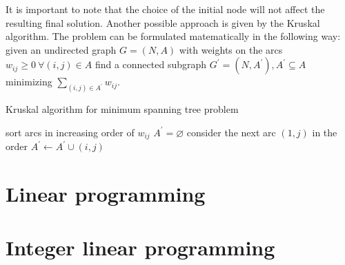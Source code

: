 \documentclass[12pt, a4paper]{report}
\theoremstyle{remark}
\begin{document}
It is important to note that the choice of the initial node will not affect the resulting final solution. 
Another possible approach is given by the Kruskal algorithm. The problem can be formulated matematically in the following way: given an 
undirected graph $G=(N,A)$ with weights on the arcs $w_{ij} \geq 0 \: \forall (i,j) \in A$ find a connected subgraph 
$G^{'}=(N,A^{'}),A^{'} \subseteq A$ minimizing $\sum_{(i,j) \in A^{'}}w_{ij}$.  
\begin{algorithm}
    \caption{Kruskal algorithm for minimum spanning tree problem}
        \begin{algorithmic}[1]
            \State sort arcs in increasing order of $w_{ij}$
            \State $A^{'}=\varnothing$
                \State consider the next arc $(1,j)$ in the order
                \State $A^{'} \leftarrow A^{'} \cup (i,j)$
                \EndIf
            \EndWhile
            \State \Return
        \end{algorithmic}
\end{algorithm}





\newpage

\chapter{Linear programming}



\newpage

\chapter{Integer linear programming}










    

    
\end{document}
